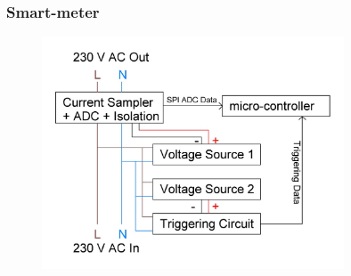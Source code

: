 \documentclass{beamer}
\begin{document}
	




	\begin{frame}\frametitle{Smart-meter}
		
		\begin{figure}
			\centering
			\includegraphics[width=0.8\textwidth]{../chapters/hardware-chapters/AC/ac-current-sampler/ac-current-sampler-architectural.JPG}
		\end{figure}

	\end{frame}
	
\end{document}
